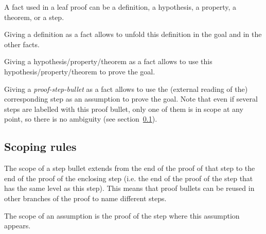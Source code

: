 
A fact used in a leaf proof can be a definition, a hypothesis, a
property, a theorem, or a step.

Giving a definition as a fact allows \zenon{} to unfold this
definition in the goal and in the other facts.

Giving a hypothesis/property/theorem as a fact allows \zenon{} to use
this hypothesis/property/theorem to prove the goal.

Giving a {\em proof-step-bullet} as a fact allows \zenon{} to use the
(external reading of the) corresponding step as an assumption to prove
the goal.  Note that even if several steps are labelled with this
proof bullet, only one of them is in scope at any point, so there is
no ambiguity (see section~\ref{sec:scoping}).

\subsection{Scoping rules}\label{sec:scoping}

The scope of a step bullet extends from the end of the proof of that
step to the end of the proof of the enclosing step (i.e. the end of
the proof of the  step that has the same level as this
step).  This means that proof bullets can be reused in other branches
of the proof to name different steps.

The scope of an assumption is the proof of the step where this
assumption appears.
